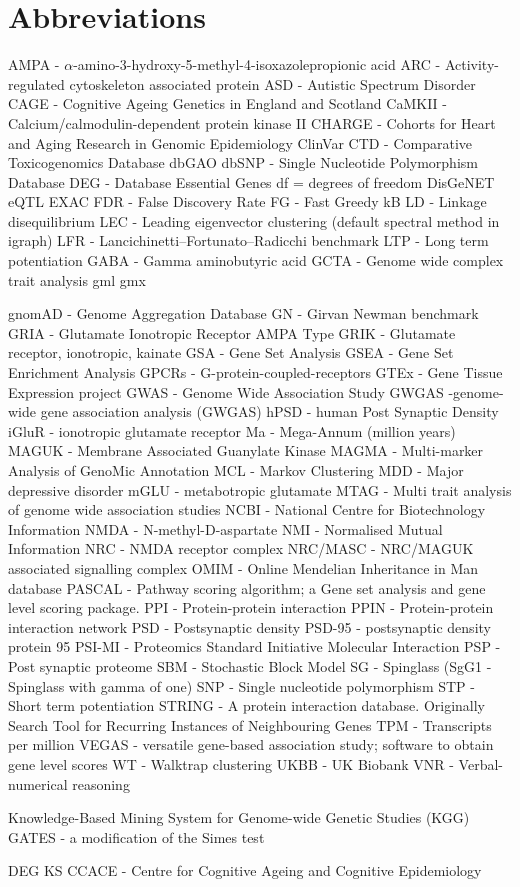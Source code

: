 \chapter{Abbreviations}



AMPA - $\alpha$-amino-3-hydroxy-5-methyl-4-isoxazolepropionic acid
ARC - Activity-regulated cytoskeleton associated protein
ASD - Autistic Spectrum Disorder
CAGE - Cognitive Ageing Genetics in England and Scotland
CaMKII - Calcium/calmodulin-dependent protein kinase II
CHARGE -  Cohorts for Heart and Aging Research in Genomic Epidemiology
ClinVar
CTD - Comparative Toxicogenomics Database
dbGAO
dbSNP - Single Nucleotide Polymorphism Database
DEG - Database Essential Genes
df = degrees of freedom
DisGeNET
eQTL
EXAC
FDR - False Discovery Rate
FG - Fast Greedy
kB
LD - Linkage disequilibrium
LEC - Leading eigenvector clustering (default spectral method in igraph)
LFR - Lancichinetti–Fortunato–Radicchi benchmark 
LTP - Long term potentiation
GABA - Gamma aminobutyric acid 
GCTA - Genome wide complex trait analysis
gml
gmx

gnomAD - Genome Aggregation Database
GN - Girvan Newman benchmark
GRIA - Glutamate Ionotropic Receptor AMPA Type
GRIK - Glutamate receptor, ionotropic, kainate 
GSA - Gene Set Analysis
GSEA - Gene Set Enrichment Analysis
GPCRs - G-protein-coupled-receptors
GTEx - Gene Tissue Expression project 
GWAS - Genome Wide Association Study
GWGAS -genome-wide gene association analysis (GWGAS) 
hPSD - human Post Synaptic Density 
iGluR - ionotropic glutamate receptor
Ma - Mega-Annum (million years)
MAGUK - Membrane Associated Guanylate Kinase 
MAGMA - Multi-marker Analysis of GenoMic Annotation
MCL - Markov Clustering
MDD - Major depressive disorder
mGLU - metabotropic glutamate 
MTAG - Multi trait analysis of genome wide association studies
NCBI - National Centre for Biotechnology Information
NMDA - N-methyl-D-aspartate 
NMI - Normalised Mutual Information
NRC - NMDA receptor complex
NRC/MASC - NRC/MAGUK associated signalling complex
OMIM - Online Mendelian Inheritance in Man database
PASCAL - Pathway scoring algorithm; a Gene set analysis and gene level scoring package.
PPI - Protein-protein interaction
PPIN - Protein-protein interaction network
PSD - Postsynaptic density
PSD-95 - postsynaptic density protein 95
PSI-MI - Proteomics Standard Initiative Molecular Interaction
PSP - Post synaptic proteome
SBM - Stochastic Block Model 
SG - Spinglass (SgG1 - Spinglass with gamma of one)
SNP - Single nucleotide polymorphism
STP - Short term potentiation
STRING - A protein interaction database. Originally Search Tool for Recurring Instances of Neighbouring Genes
TPM - Transcripts per million
VEGAS - versatile gene-based association study; software to obtain gene level scores
WT - Walktrap clustering
UKBB - UK Biobank
VNR - Verbal-numerical reasoning

Knowledge-Based Mining System for Genome-wide Genetic Studies (KGG)
GATES - a modification of the Simes test

DEG
KS 
CCACE - Centre for Cognitive Ageing and Cognitive Epidemiology